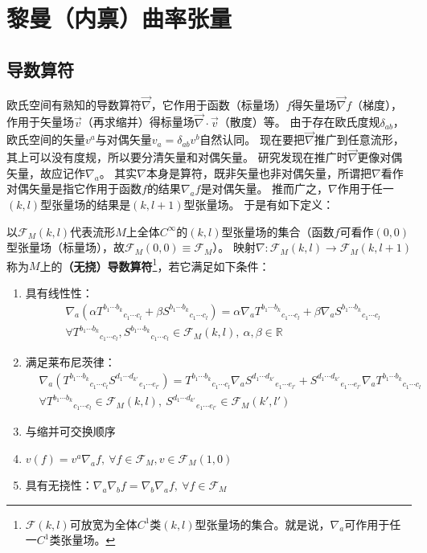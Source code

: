 \chapter{黎曼（内禀）曲率张量}

\section{导数算符}

欧氏空间有熟知的导数算符$\vec{\nabla}$，它作用于函数（标量场）$f$得矢量场$\vec{\nabla}f$（梯度），作用于矢量场$\vec{v}$（再求缩并）得标量场$\vec{\nabla}\cdot\vec{v}$（散度）等。
由于存在欧氏度规$\delta_{ab}$，欧氏空间的矢量$v^a$与对偶矢量$v_a = \delta_{ab}v^b$自然认同。
现在要把$\vec{\nabla}$推广到任意流形，其上可以没有度规，所以要分清矢量和对偶矢量。
研究发现在推广时$\vec{\nabla}$更像对偶矢量，故应记作$\nabla_a$。
其实$\nabla$本身是算符，既非矢量也非对偶矢量，所谓把$\nabla$看作对偶矢量是指它作用于函数$f$的结果$\nabla_af$是对偶矢量。
推而广之，$\nabla$作用于任一$(k, l)$型张量场的结果是$(k, l + 1)$型张量场。
于是有如下定义：

\begin{definition}
以$\mathscr{F}_M(k, l)$代表流形$M$上全体$C^\infty$的$(k, l)$型张量场的集合（函数$f$可看作$(0, 0)$型张量场（标量场），故$\mathscr{F}_M(0, 0) \equiv \mathscr{F}_M$）。
映射$\nabla \colon \mathscr{F}_M(k, l) \to \mathscr{F}_M(k, l + 1)$称为$M$上的\textbf{（无挠）导数算符}\footnote{
$\mathscr{F}(k, l)$可放宽为全体$C^1$类$(k, l)$型张量场的集合。就是说，$\nabla_a$可作用于任一$C^1$类张量场。
}，若它满足如下条件：
\begin{enumerate}[（a）]
\item 具有线性性：
$$\begin{aligned}
& \nabla_a(\alpha T^{b_1 \cdots b_k}{}_{c_1 \cdots c_l} + \beta S^{b_1 \cdots b_k}{}_{c_1 \cdots c_l}) = \alpha\nabla_aT^{b_1 \cdots b_k}{}_{c_1 \cdots c_l} + \beta\nabla_aS^{b_1 \cdots b_k}{}_{c_1 \cdots c_l} \\
& \forall T^{b_1 \cdots b_k}{}_{c_1 \cdots c_l}, S^{b_1 \cdots b_k}{}_{c_1 \cdots c_l} \in \mathscr{F}_M(k, l), ~ \alpha, \beta \in \mathbb{R}
\end{aligned}$$
\item 满足莱布尼茨律：
$$\begin{aligned}
& \nabla_a(T^{b_1 \cdots b_k}{}_{c_1 \cdots c_l}S^{d_1 \cdots d_{k'}}{}_{e_1 \cdots e_{l'}}) = T^{b_1 \cdots b_k}{}_{c_1 \cdots c_l} \nabla_a S^{d_1 \cdots d_{k'}}{}_{e_1 \cdots e_{l'}} + S^{d_1 \cdots d_{k'}}{}_{e_1 \cdots e_{l'}} \nabla_a T^{b_1 \cdots b_k}{}_{c_1 \cdots c_l} \\
& \forall T^{b_1 \cdots b_k}{}_{c_1 \cdots c_l} \in \mathscr{F}_M(k, l), ~ S^{d_1 \cdots d_{k'}}{}_{e_1 \cdots e_{l'}} \in \mathscr{F}_M(k', l')
\end{aligned}$$
\item 与缩并可交换顺序
\item $v(f) = v^a\nabla_af, ~ \forall f \in \mathscr{F}_M, v \in \mathscr{F}_M(1, 0)$
\item 具有无挠性：$\nabla_a\nabla_bf = \nabla_b\nabla_af, ~ \forall f \in \mathscr{F}_M$
\end{enumerate}
\end{definition}

